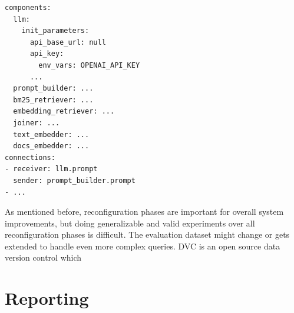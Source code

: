 \newpage
\begin{verbatim}
components:
  llm:
    init_parameters:
      api_base_url: null
      api_key:
        env_vars: OPENAI_API_KEY
      ...
  prompt_builder: ...
  bm25_retriever: ...
  embedding_retriever: ...
  joiner: ...
  text_embedder: ...
  docs_embedder: ...
connections:
- receiver: llm.prompt
  sender: prompt_builder.prompt
- ...
\end{verbatim}

As mentioned before, reconfiguration phases are important for overall system improvements, but doing generalizable and valid experiments over all reconfiguration phases is difficult. The evaluation dataset might change or gets extended to handle even more complex queries. DVC\cite{dvc.17.03.2025} is an open source data version control which 


\section{Reporting}






